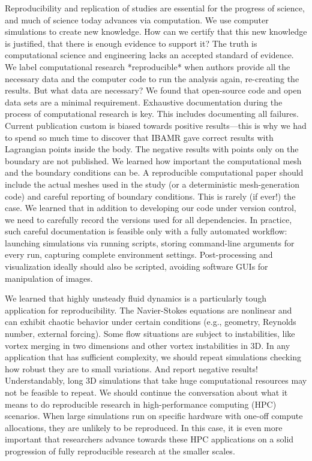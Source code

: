 \documentclass[9pt,twocolumn,twoside]{article}
\newlength{\up}
\begin{document}
Reproducibility and replication of studies are essential for the progress of science, and much of science today advances via computation. 
We use computer simulations to create new knowledge. 
How can we certify that this new knowledge is justified, that there is enough evidence to support it? 
The truth is computational science and engineering lacks an accepted standard of evidence. 
We label computational research *reproducible* when authors provide all the necessary data and the computer code to run the analysis again, re-creating the results. 
But what data are necessary? 
We found that open-source code and open data sets are a minimal requirement. 
Exhaustive documentation during the process of computational research is key. 
This includes documenting all failures. 
Current publication custom is biased towards positive results---this is why we had to spend so much time to discover that IBAMR gave correct results with Lagrangian points inside the body. 
The negative results with points only on the boundary are not published. 
We learned how important the computational mesh and the boundary conditions can be. 
A reproducible computational paper should include the actual meshes used in the study (or a deterministic mesh-generation code) and careful reporting of boundary conditions. 
This is rarely (if ever!) the case. 
We learned that in addition to developing our code under version control, we need to carefully record the versions used for all dependencies. 
In practice, such careful documentation is feasible only with a fully automated workflow: 
launching simulations via running scripts, storing command-line arguments for every run, capturing complete environment settings. 
Post-processing and visualization ideally should also be scripted, avoiding software GUIs for manipulation of images. 

We learned that highly unsteady fluid dynamics is a particularly tough application for reproducibility. 
The Navier-Stokes equations are nonlinear and can exhibit chaotic behavior under certain conditions (e.g., geometry, Reynolds number, external forcing). 
Some flow situations are subject to instabilities, like vortex merging in two dimensions and other vortex instabilities in 3D. 
In any application that has sufficient complexity, we should repeat simulations checking how robust they are to small variations. 
And report negative results! 
Understandably, long 3D simulations that take huge computational resources may not be feasible to repeat. 
We should continue the conversation about what it means to do reproducible research in high-performance computing (HPC) scenarios. 
When large simulations run on specific hardware with one-off compute allocations, they are unlikely to be reproduced. 
In this case, it is even more important that researchers advance towards these HPC applications on a solid progression of fully reproducible research at the smaller scales.
\end{document}
